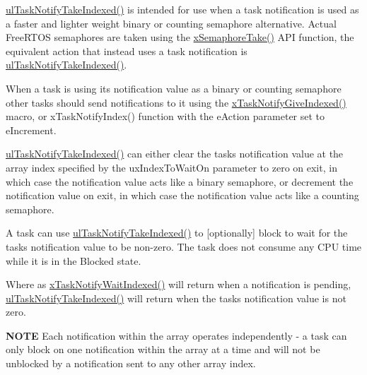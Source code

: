 \hyperlink{externals_2freertos_2include_2task_8h_a4f42982425f3b106e1a9f19b41ba4124}{ul\+Task\+Notify\+Take\+Indexed()} is intended for use when a task notification is used as a faster and lighter weight binary or counting semaphore alternative. Actual Free\+R\+T\+OS semaphores are taken using the \hyperlink{externals_2freertos_2include_2semphr_8h_af116e436d2a5ae5bd72dbade2b5ea930}{x\+Semaphore\+Take()} A\+PI function, the equivalent action that instead uses a task notification is \hyperlink{externals_2freertos_2include_2task_8h_a4f42982425f3b106e1a9f19b41ba4124}{ul\+Task\+Notify\+Take\+Indexed()}.

When a task is using its notification value as a binary or counting semaphore other tasks should send notifications to it using the \hyperlink{externals_2freertos_2include_2task_8h_a53ec0c8b6b8281a3055747813570193c}{x\+Task\+Notify\+Give\+Indexed()} macro, or x\+Task\+Notify\+Index() function with the e\+Action parameter set to e\+Increment.

\hyperlink{externals_2freertos_2include_2task_8h_a4f42982425f3b106e1a9f19b41ba4124}{ul\+Task\+Notify\+Take\+Indexed()} can either clear the task\textquotesingle{}s notification value at the array index specified by the ux\+Index\+To\+Wait\+On parameter to zero on exit, in which case the notification value acts like a binary semaphore, or decrement the notification value on exit, in which case the notification value acts like a counting semaphore.

A task can use \hyperlink{externals_2freertos_2include_2task_8h_a4f42982425f3b106e1a9f19b41ba4124}{ul\+Task\+Notify\+Take\+Indexed()} to \mbox{[}optionally\mbox{]} block to wait for the task\textquotesingle{}s notification value to be non-\/zero. The task does not consume any C\+PU time while it is in the Blocked state.

Where as \hyperlink{externals_2freertos_2include_2task_8h_a5bcd5a5b7d7c41dd782a38093be1b7c9}{x\+Task\+Notify\+Wait\+Indexed()} will return when a notification is pending, \hyperlink{externals_2freertos_2include_2task_8h_a4f42982425f3b106e1a9f19b41ba4124}{ul\+Task\+Notify\+Take\+Indexed()} will return when the task\textquotesingle{}s notification value is not zero.

{\bfseries N\+O\+TE} Each notification within the array operates independently -\/ a task can only block on one notification within the array at a time and will not be unblocked by a notification sent to any other array index.


